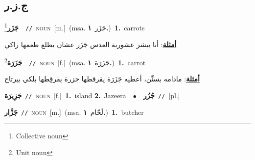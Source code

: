 \documentclass[10pt,a4paper,twoside]{article} %
\begin{document}
\begin{multicols}{2}
\vspace{-3mm}
\subsection*{\color{blue}\foreignlanguage{arabic}{ج.ز.ر}\color{blue}{}} 

{\setlength\topsep{0pt}\textbf{\foreignlanguage{arabic}{جَزَر}}\footnote{Collective noun}\ \ {\color{gray}\texttt{//}\color{black}}\ \textsc{noun}\ [m.]\ \color{gray}(msa. \foreignlanguage{arabic}{جَزَر}~\foreignlanguage{arabic}{\textbf{١.}})\color{black}\ \textbf{1.}~carrots\  \begin{flushright}\color{gray}\foreignlanguage{arabic}{\textbf{\underline{\foreignlanguage{arabic}{أمثلة}}}: أنا ببشر عشوربة العدس جَزَر عشان يطلع طعمها زاكي}\end{flushright}\color{black}} \vspace{2mm}

{\setlength\topsep{0pt}\textbf{\foreignlanguage{arabic}{جَزَرَة}}\footnote{Unit noun}\ \ {\color{gray}\texttt{//}\color{black}}\ \textsc{noun}\ [f.]\ \color{gray}(msa. \foreignlanguage{arabic}{جَزَرَة}~\foreignlanguage{arabic}{\textbf{١.}})\color{black}\ \textbf{1.}~carrot\  \begin{flushright}\color{gray}\foreignlanguage{arabic}{\textbf{\underline{\foreignlanguage{arabic}{أمثلة}}}: مادامه بسنِّن، أعطيه جَزَرَة يقرقطها جزرة يقرقِطها بلكي بيرتاح}\end{flushright}\color{black}} \vspace{2mm}

{\setlength\topsep{0pt}\textbf{\foreignlanguage{arabic}{جَزِيرَة}}\ {\color{gray}\texttt{//}\color{black}}\ \textsc{noun}\ [f.]\ \textbf{1.}~island  \textbf{2.}~Jazeera\ \ $\bullet$\ \ \setlength\topsep{0pt}\textbf{\foreignlanguage{arabic}{جُزُر}}\ {\color{gray}\texttt{//}\color{black}}\ [pl.]\ } \vspace{2mm}

{\setlength\topsep{0pt}\textbf{\foreignlanguage{arabic}{جَزَّار}}\ {\color{gray}\texttt{//}\color{black}}\ \textsc{noun}\ [m.]\ \color{gray}(msa. \foreignlanguage{arabic}{لَحّام}~\foreignlanguage{arabic}{\textbf{١.}})\color{black}\ \textbf{1.}~butcher\ } \vspace{2mm}


\end{multicols}
\end{document}
